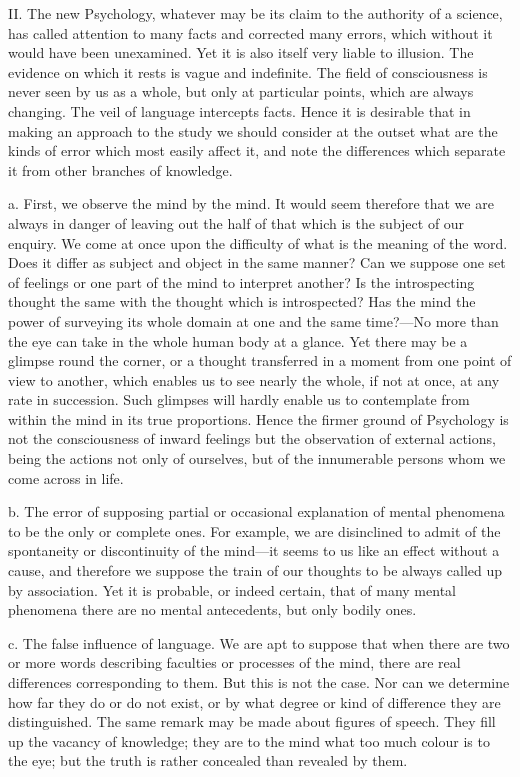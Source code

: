 \documentclass[11pt,letter]{article}
\begin{document}
\par  II. The new Psychology, whatever may be its claim to the authority of a science, has called attention to many facts and corrected many errors, which without it would have been unexamined. Yet it is also itself very liable to illusion. The evidence on which it rests is vague and indefinite. The field of consciousness is never seen by us as a whole, but only at particular points, which are always changing. The veil of language intercepts facts. Hence it is desirable that in making an approach to the study we should consider at the outset what are the kinds of error which most easily affect it, and note the differences which separate it from other branches of knowledge.

\par  a. First, we observe the mind by the mind. It would seem therefore that we are always in danger of leaving out the half of that which is the subject of our enquiry. We come at once upon the difficulty of what is the meaning of the word. Does it differ as subject and object in the same manner? Can we suppose one set of feelings or one part of the mind to interpret another? Is the introspecting thought the same with the thought which is introspected? Has the mind the power of surveying its whole domain at one and the same time?—No more than the eye can take in the whole human body at a glance. Yet there may be a glimpse round the corner, or a thought transferred in a moment from one point of view to another, which enables us to see nearly the whole, if not at once, at any rate in succession. Such glimpses will hardly enable us to contemplate from within the mind in its true proportions. Hence the firmer ground of Psychology is not the consciousness of inward feelings but the observation of external actions, being the actions not only of ourselves, but of the innumerable persons whom we come across in life.

\par  b. The error of supposing partial or occasional explanation of mental phenomena to be the only or complete ones. For example, we are disinclined to admit of the spontaneity or discontinuity of the mind—it seems to us like an effect without a cause, and therefore we suppose the train of our thoughts to be always called up by association. Yet it is probable, or indeed certain, that of many mental phenomena there are no mental antecedents, but only bodily ones.

\par  c. The false influence of language. We are apt to suppose that when there are two or more words describing faculties or processes of the mind, there are real differences corresponding to them. But this is not the case. Nor can we determine how far they do or do not exist, or by what degree or kind of difference they are distinguished. The same remark may be made about figures of speech. They fill up the vacancy of knowledge; they are to the mind what too much colour is to the eye; but the truth is rather concealed than revealed by them.
\end{document}

